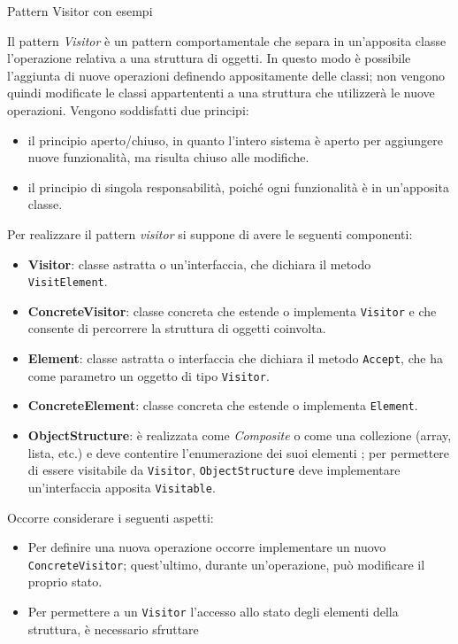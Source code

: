 \begin{problem}{1.23}
Pattern Visitor con esempi
\end{problem}
\begin{solution}
Il pattern \textit{Visitor} è un pattern comportamentale che separa in un'apposita classe l'operazione relativa a una struttura di oggetti.
\newline
In questo modo è possibile l'aggiunta di nuove operazioni definendo appositamente delle classi; non vengono quindi modificate le classi appartententi a una struttura che utilizzerà le nuove operazioni.
Vengono soddisfatti due principi:
\begin{itemize}
\item il principio aperto/chiuso, in quanto l'intero sistema è aperto per aggiungere nuove funzionalità, ma risulta chiuso alle modifiche.
\item il principio di singola responsabilità, poiché ogni funzionalità è in un'apposita classe.
\end{itemize}
Per realizzare il pattern \textit{visitor} si suppone di avere le seguenti componenti:
\begin{itemize}
	\item \textbf{Visitor}: classe astratta o un'interfaccia, che dichiara il metodo \texttt{VisitElement}.
	\item \textbf{ConcreteVisitor}: classe concreta che estende o implementa \texttt{Visitor} e che consente di percorrere la struttura di oggetti coinvolta.
	\item \textbf{Element}: classe astratta o interfaccia che dichiara il metodo \texttt{Accept}, che ha come parametro un oggetto di tipo \texttt{Visitor}.
	\item \textbf{ConcreteElement}: classe concreta che estende o implementa \texttt{Element}.
	\item \textbf{ObjectStructure}: è realizzata come \textit{Composite} o come una collezione (array, lista, etc.) e deve contentire l'enumerazione dei suoi elementi ; per permettere di essere visitabile da \texttt{Visitor}, \texttt{ObjectStructure} deve implementare un'interfaccia apposita \texttt{Visitable}.
\end{itemize}
Occorre considerare i seguenti aspetti:
\begin{itemize}
	\item Per definire una nuova operazione occorre implementare un nuovo \texttt{ConcreteVisitor}; quest'ultimo, durante un'operazione, può modificare il proprio stato.
	\item Per permettere a un \texttt{Visitor} l'accesso allo stato degli elementi della struttura, è necessario sfruttare

\end{itemize}
\end{solution}
